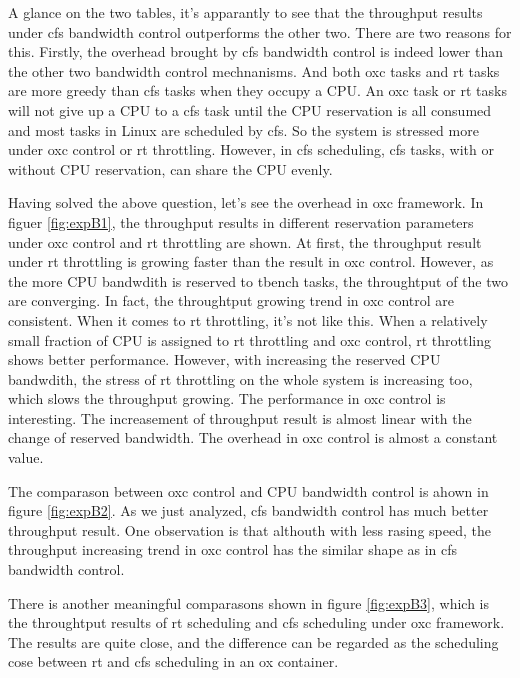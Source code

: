 A glance on the two tables, it's apparantly to see that the throughput results
under cfs bandwidth control outperforms the other two. There are two reasons for this.
Firstly, the overhead brought by cfs bandwidth control is indeed lower 
than the other two bandwidth control mechnanisms.
And both oxc tasks and rt tasks are more greedy than cfs tasks when they occupy a CPU. 
An oxc task or rt tasks will not give up a CPU to a cfs task until the 
CPU reservation is all consumed and most tasks in Linux are scheduled by cfs.
So the system is stressed more under oxc control or rt throttling.
However, in cfs scheduling, cfs tasks, with or without
CPU reservation, can share the CPU evenly.

Having solved the above question, let's see the overhead in oxc framework.
In figuer \ref{fig:expB1}, the throughput results in different reservation
parameters under oxc control and rt throttling are shown.
At first, the throughput result under rt throttling is growing faster 
than the result in oxc control. However, as the more CPU bandwdith is
reserved to tbench tasks, the throughtput of the two are converging.
In fact, the throughtput growing trend in oxc control are consistent.
When it comes to rt throttling, it's not like this.
When a relatively small fraction of CPU is assigned to rt throttling
and oxc control, rt throttling shows better performance. However, with
increasing the reserved CPU bandwdith, the stress of rt throttling on
the whole system is increasing too, which slows the throughput growing. 
The performance in oxc control is interesting. The increasement of 
throughput result is almost linear with the change of reserved bandwidth.
The overhead in oxc control is almost a constant value.

The comparason between oxc control and CPU bandwidth control is ahown 
in figure \ref{fig:expB2}. As we just analyzed, cfs bandwidth control has
much better throughput result. One observation is that althouth with
less rasing speed, the throughput increasing trend in oxc control has the
similar shape as in cfs bandwidth control. 

There is another meaningful comparasons shown in figure \ref{fig:expB3}, which
is the throughtput results of rt scheduling and cfs scheduling under oxc 
framework. The results are quite close, and the difference can be regarded as
the scheduling cose between rt and cfs scheduling in an ox container.

